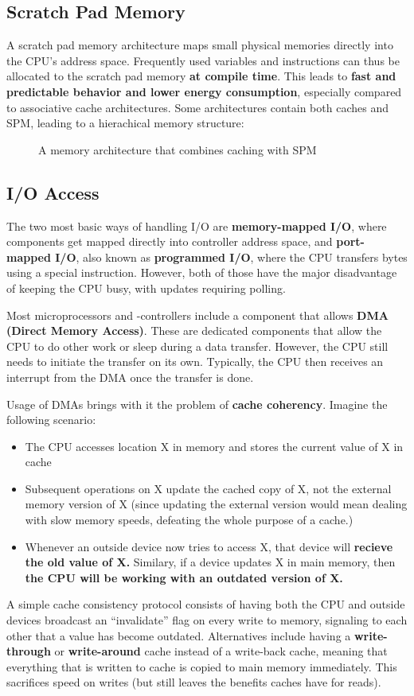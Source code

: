\documentclass{report}
\newcommand{\tbf}{\textbf}
\newcommand*{\newpar}{\par\vspace{\baselineskip}\noindent} %
\begin{document}
\subsection{Scratch Pad Memory}
A scratch pad memory architecture maps small physical memories directly into the CPU's address space. Frequently used variables and instructions can thus be allocated to the scratch pad memory \tbf{at compile time}. This leads to \tbf{fast and predictable behavior and lower energy consumption}, especially compared to associative cache architectures. Some architectures contain both caches and SPM, leading to a hierachical memory structure:
\begin{figure}[h!]
\centering

\caption{A memory architecture that combines caching with SPM}
\label{fig:memoryhierarchy}
\end{figure}
%
\subsection{I/O Access}
The two most basic ways of handling I/O are \tbf{memory-mapped I/O}, where components get mapped directly into controller address space, and \tbf{port-mapped I/O}, also known as \tbf{programmed I/O}, where the CPU transfers bytes using a special instruction. However, both of those have the major disadvantage of keeping the CPU busy, with updates requiring polling.
\newpar
Most microprocessors and -controllers include a component that allows \tbf{DMA (Direct Memory Access)}. These are dedicated components that allow the CPU to do other work or sleep during a data transfer. However, the CPU still needs to initiate the transfer on its own. Typically, the CPU then receives an interrupt from the DMA once the transfer is done.
\newpar
Usage of DMAs brings with it the problem of \tbf{cache coherency}. Imagine the following scenario:
\begin{itemize}
 \item The CPU accesses location X in memory and stores the current value of X in cache
 \item Subsequent operations on X update the cached copy of X, not the external memory version of X (since updating the external version would mean dealing with slow memory speeds, defeating the whole purpose of a cache.)
 \item Whenever an outside device now tries to access X, that device will \tbf{recieve the old value of X.} Similary, if a device updates X in main memory, then \tbf{the CPU will be working with an outdated version of X.}
\end{itemize}
A simple cache consistency protocol consists of having both the CPU and outside devices broadcast an ``invalidate'' flag on every write to memory, signaling to each other that a value has become outdated. Alternatives include having a \tbf{write-through} or \tbf{write-around} cache instead of a write-back cache, meaning that everything that is written to cache is copied to main memory immediately. This sacrifices speed on writes (but still leaves the benefits caches have for reads).
\end{document}
